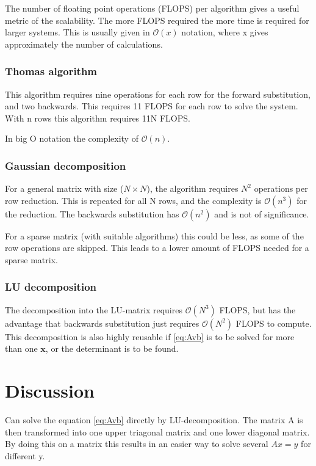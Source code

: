 \documentclass[11pt,a4paper,english,final]{article}
\numberwithin{equation}{section}
\newcommand{\ve}[1]{\mathbf{#1}} %
\newcommand{\bigO}[1]{\mathcal{O}\left( #1 \right)}
\begin{document}
The number of floating point operations (FLOPS) per algorithm gives a useful 
metric of the scalability. The more FLOPS required the more time is
required for larger systems. This is usually given in $\bigO{x}$ notation,
where x gives approximately the number of calculations.

\subsubsection{Thomas algorithm}
This algorithm requires nine operations for each row for the forward substitution,
and two backwards. This requires 11 FLOPS for each row to solve the system.
With n rows this algorithm requires 11N FLOPS.

In big O notation the complexity of $\bigO{n}$.

\subsubsection{Gaussian decomposition}
For a general matrix with size ($N\times N$), the algorithm requires
$N^2$ operations per row reduction. This is repeated for all N rows,
and the complexity is $\bigO{n^3}$ for the reduction. The backwards 
substitution has $\bigO{n^2}$ and is not of significance.

For a sparse matrix (with suitable algorithms) this could be less, 
as some of the row operations are
skipped. This leads to a lower amount of FLOPS needed for a sparse
matrix.

\subsubsection{LU decomposition}
The decomposition into the LU-matrix requires $\bigO{N^3}$ FLOPS, but 
has the advantage that backwards substitution just requires $\bigO{N^2}$
FLOPS to compute. This decomposition is also highly reusable if \eqref{eq:Avb}
is to be solved for more than one $\ve{x}$, or the determinant is to be found.

\section{Discussion}

Can solve the equation \eqref{eq:Avb} directly by LU-decomposition.
The matrix A is then transformed into one upper triagonal matrix and
one lower diagonal matrix. By doing this on a matrix this results in an
easier way to solve several $Ax = y$ for different y.
\end{document}
